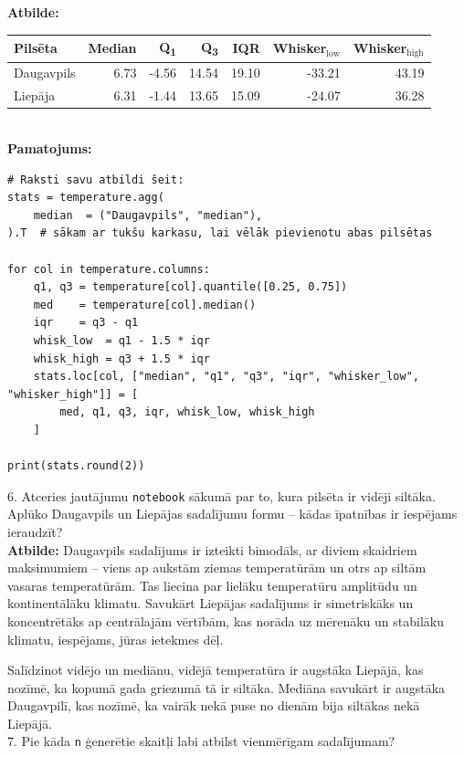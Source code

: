\documentclass[12pt]{article}
\begin{document}
\textbf{Atbilde:}
\begin{table}[h]
\centering
\begin{tabular}{lrrrrrr}
\hline
Pilsēta & Median & Q\textsubscript{1} & Q\textsubscript{3} & IQR & Whisker\(_\text{low}\) & Whisker\(_\text{high}\) \\
\hline
Daugavpils & 6.73 & -4.56 & 14.54 & 19.10 & -33.21 & 43.19 \\
Liepāja    & 6.31 & -1.44 & 13.65 & 15.09 & -24.07 & 36.28 \\
\hline
\end{tabular}
\end{table}\\

\textbf{Pamatojums:}
\begin{verbatim}
# Raksti savu atbildi šeit:
stats = temperature.agg(
    median  = ("Daugavpils", "median"),
).T  # sākam ar tukšu karkasu, lai vēlāk pievienotu abas pilsētas

for col in temperature.columns:
    q1, q3 = temperature[col].quantile([0.25, 0.75])
    med    = temperature[col].median()
    iqr    = q3 - q1
    whisk_low  = q1 - 1.5 * iqr
    whisk_high = q3 + 1.5 * iqr
    stats.loc[col, ["median", "q1", "q3", "iqr", "whisker_low", "whisker_high"]] = [
        med, q1, q3, iqr, whisk_low, whisk_high
    ]

print(stats.round(2))
\end{verbatim}

6. Atceries jautājumu \texttt{notebook} sākumā par to, kura pilsēta ir vidēji siltāka. Aplūko Daugavpils un Liepājas sadalījumu formu – kādas īpatnības ir iespējams ieraudzīt?\\ 

\textbf{Atbilde:} Daugavpils sadalījums ir izteikti bimodāls, ar diviem skaidriem maksimumiem – viens ap aukstām ziemas temperatūrām un otrs ap siltām vasaras temperatūrām. Tas liecina par lielāku temperatūru amplitūdu un kontinentālāku klimatu. Savukārt Liepājas sadalījums ir simetriskāks un koncentrētāks ap centrālajām vērtībām, kas norāda uz mērenāku un stabilāku klimatu, iespējams, jūras ietekmes dēļ.

Salīdzinot vidējo un mediānu, vidējā temperatūra ir augstāka Liepājā, kas nozīmē, ka kopumā gada griezumā tā ir siltāka. Mediāna savukārt ir augstāka Daugavpilī, kas nozīmē, ka vairāk nekā puse no dienām bija siltākas nekā Liepājā.\\

7. Pie kāda \texttt{n} ģenerētie skaitļi labi atbilst vienmērīgam sadalījumam?\\ 
\end{document}
